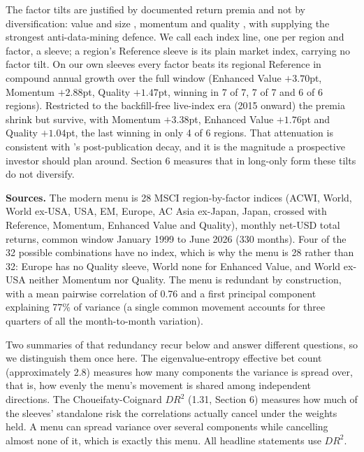\documentclass[12pt,letterpaper]{article}
\newcommand{\nuevo}[1]{{\color{nuevoc}#1}}
\newcommand{\head}[1]{\noindent\textbf{#1}\hspace{0.5em}\ignorespaces}
\begin{document}
The factor tilts are justified by documented return premia and not by
diversification: value and size \citep{fama1993}, momentum \citep{jegadeesh1993}
and quality \citep{asness2019}, with \citet{asness2013} supplying the strongest
anti-data-mining defence. We call each index line, one per region and factor, a sleeve; a region's Reference sleeve is its plain market index, carrying no factor tilt. On our own sleeves every
factor beats its regional Reference in compound annual growth over the full window (Enhanced Value
$+3.70$pt, Momentum $+2.88$pt, Quality $+1.47$pt, winning in 7 of 7, 7 of 7 and
6 of 6 regions). Restricted to the backfill-free live-index era (2015 onward) the premia shrink but survive, with
Momentum $+3.38$pt, Enhanced Value $+1.76$pt and Quality $+1.04$pt, the last
winning in only 4 of 6 regions. That attenuation is consistent with
\citeauthor{mclean2016}'s \citeyearpar{mclean2016} post-publication decay, and it
is the magnitude a prospective investor should plan around. Section 6 measures
that in long-only form these tilts do not diversify.

\head{Sources.} The modern menu is 28 MSCI region-by-factor indices (ACWI, World,
World ex-USA, USA, EM, Europe, AC Asia ex-Japan, Japan, crossed with Reference, Momentum, Enhanced Value and Quality), monthly net-USD total returns,
common window January 1999 to June 2026 (330 months). Four of the 32 possible combinations have
no index, which is why the menu is 28 rather than 32: Europe has no Quality sleeve, World none
for Enhanced Value, and World ex-USA neither Momentum nor Quality. The menu is redundant by
construction, with a mean pairwise correlation of 0.76 and a first principal component
explaining 77\% of variance\nuevo{ (a single common movement accounts for three quarters of
all the month-to-month variation)}.

Two summaries of that redundancy recur below and answer different questions, so we distinguish
them once here. The eigenvalue-entropy effective bet count (approximately 2.8) measures how
many components the variance is spread over\nuevo{, that is, how evenly the menu's movement is
shared among independent directions}. The Choueifaty-Coignard $DR^{2}$ (1.31, Section 6)
measures how much of the sleeves' standalone risk the correlations actually cancel under the
weights held. A menu can spread variance over several components while cancelling almost none
of it, which is exactly this menu. All headline statements use $DR^{2}$.
\end{document}
